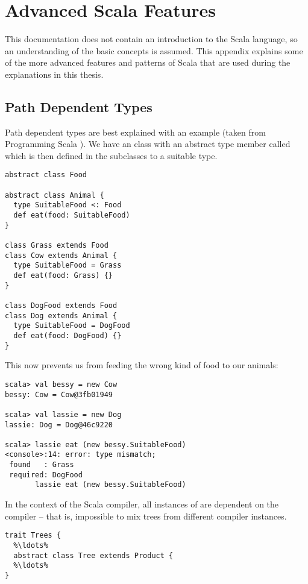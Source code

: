 
\chapter{Advanced Scala Features} \label{chapter:advanced-scala-features}

This documentation does not contain an introduction to the Scala language, so an understanding of the basic concepts is assumed. This appendix explains some of the more advanced features and patterns of Scala that are used during the explanations in this thesis.

\section{Path Dependent Types} \label{section:path-dependent-types}

Path dependent types are best explained with an example (taken from Programming Scala \cite{ProgrammingScala}). We have an  class with an abstract type member called  which is then defined in the subclasses to a suitable type.
\begin{lstlisting}
abstract class Food

abstract class Animal {
  type SuitableFood <: Food
  def eat(food: SuitableFood)
}

class Grass extends Food
class Cow extends Animal {
  type SuitableFood = Grass
  def eat(food: Grass) {}
}

class DogFood extends Food
class Dog extends Animal {
  type SuitableFood = DogFood
  def eat(food: DogFood) {}
}
\end{lstlisting}

This now prevents us from feeding the wrong kind of food to our animals:

\begin{lstlisting}
scala> val bessy = new Cow
bessy: Cow = Cow@3fb01949

scala> val lassie = new Dog
lassie: Dog = Dog@46c9220

scala> lassie eat (new bessy.SuitableFood)
<console>:14: error: type mismatch;
 found   : Grass
 required: DogFood
       lassie eat (new bessy.SuitableFood)
\end{lstlisting}

In the context of the Scala compiler, all instances of  are dependent on the compiler -- that is, impossible to mix trees from different compiler instances.

\begin{lstlisting}
trait Trees {
  %\ldots%
  abstract class Tree extends Product {
  %\ldots%
}
\end{lstlisting}

